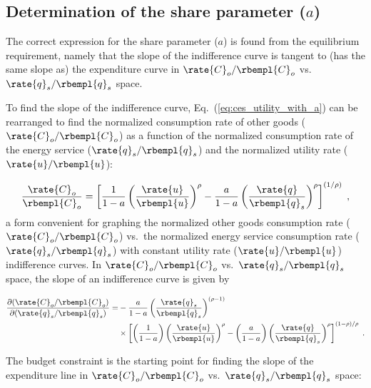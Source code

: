 \subsection{Determination of the share parameter ($a$)}
\label{sec:share_parameter_derivation}

The correct expression for the share parameter ($a$) is found from the 
equilibrium requirement,
namely that the slope of the indifference curve is tangent to 
(has the same slope as) the expenditure curve
in $\rate{C}_o/\rbempl{C}_o$ vs.\ $\rate{q}_s/\rbempl{q}_s$ space.

To find the slope of the indifference curve,
Eq.~(\ref{eq:ces_utility_with_a}) can be rearranged to find 
the normalized consumption rate of other goods ($\rate{C}_o/\rbempl{C}_o$)
as a function of the normalized consumption rate of the energy service
($\rate{q}_s/\rbempl{q}_s$)
and the normalized utility rate ($\rate{u}/\rbempl{u}$):

\begin{equation} \label{eq:utility_Co_form}
  \frac{\rate{C}_o}{\rbempl{C}_o} = 
      \left[ \frac{1}{1 - a} \left( \frac{\rate{u}}{\rbempl{u}} \right)^\rho 
            - \frac{a}{1 - a} \left( \frac{\rate{q}}{\rbempl{q}_s} \right)^\rho \right]^{(1/\rho)} \; ,
\end{equation}
%
a form convenient for graphing 
the normalized other goods consumption rate ($\rate{C}_o/\rbempl{C}_o$) vs.\ 
the normalized energy service consumption rate ($\rate{q}_s/\rbempl{q}_s$) 
with constant utility rate ($\rate{u}/\rbempl{u}$) indifference curves.
In $\rate{C}_o/\rbempl{C}_o$ vs.\ $\rate{q}_s/\rbempl{q}_s$ space, 
the slope of an indifference curve is given by 

\begin{align} \label{eq:slope_indifference_curve}
  \frac{\partial (\rate{C}_o/\rbempl{C}_o)}{\partial (\rate{q}_s/\rbempl{q}_s)} =&
        -\frac{a}{1 - a} \left( \frac{\rate{q}_s}{\rbempl{q}_s} \right)^{(\rho -1)} \nonumber  \\
        &\times \left[ \left( \frac{1}{1 - a} \right) \left( \frac{\rate{u}}{\rbempl{u}} \right)^\rho
                - \left( \frac{a}{1 - a} \right) 
                          \left( \frac{\rate{q}}{\rbempl{q}_s} \right)^\rho \right]^{(1 - \rho)/\rho} \; .
\end{align}

The budget constraint is the starting point for finding 
the slope of the expenditure line in 
$\rate{C}_o/\rbempl{C}_o$ vs.\ $\rate{q}_s/\rbempl{q}_s$ space:

